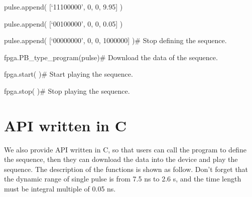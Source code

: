 pulse.append({ }[`11100000', { }0, { }0, { }9.95]{ })

pulse.append({ }[`00100000', { }0, { }0, { }0.05]{ })

pulse.append({ }[`00000000', { }0, { }0, { }1000000]{ })\qquad    \#  Stop defining the sequence.

fpga.PB\_type\_program(pulse)\qquad            \#  Download the data of the sequence.

fpga.start( )\qquad          \#  Start playing the sequence.

fpga.stop( )\qquad     \#  Stop playing the sequence.

\large


\vspace{0.2cm}
\section{\heiti API written in C }

We also provide API written in C, so that users can call the program to define the sequence, then they can download the data into the device and play the sequence. The description of the functions is shown as follow. Don't forget that the dynamic range of single pulse is from 7.5 ns to 2.6 s, and the time length must be integral multiple of 0.05 ns.

